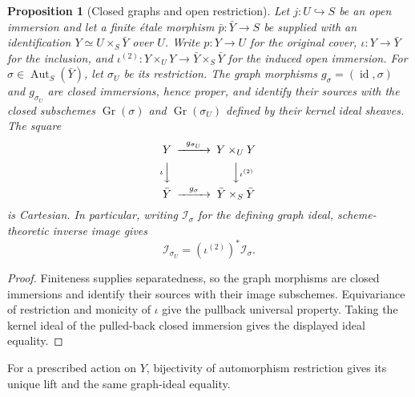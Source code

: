 \documentclass[11pt]{article}
\newtheorem{proposition}[theorem]{Proposition}
\theoremstyle{definition}
\theoremstyle{remark}
\begin{document}
\begin{proposition}[Closed graphs and open restriction]
\label{prop:graph-restriction}
Let \(j:U\hookrightarrow S\) be an open immersion and let a finite
\'{e}tale morphism \(\bar p:\bar Y\to S\) be supplied with an
identification \(Y\simeq U\times_S\bar Y\) over \(U\). Write
\(p:Y\to U\) for the original cover, \(\iota:Y\to\bar Y\) for the
inclusion, and \(\iota^{(2)}:Y\times_U Y\to\bar Y\times_S\bar Y\)
for the induced open immersion. For \(\sigma\in\operatorname{Aut}_S(\bar Y)\),
let \(\sigma_U\) be its restriction. The graph morphisms
\(g_\sigma=(\operatorname{id},\sigma)\) and \(g_{\sigma_U}\) are closed
immersions, hence proper, and identify their sources with the closed
subschemes \(\operatorname{Gr}(\sigma)\) and
\(\operatorname{Gr}(\sigma_U)\) defined by their kernel ideal sheaves.
The square
\[
\begin{CD}
Y @>{g_{\sigma_U}}>> Y\times_U Y\\
@V{\iota}VV @VV{\iota^{(2)}}V\\
\bar Y @>{g_\sigma}>> \bar Y\times_S\bar Y
\end{CD}
\]
is Cartesian. In particular, writing \(\mathcal I_\sigma\) for the
defining graph ideal, scheme-theoretic inverse image gives
\[
  \mathcal I_{\sigma_U}
    =(\iota^{(2)})^*\mathcal I_\sigma.
\]
\end{proposition}

\begin{proof}
Finiteness supplies separatedness, so the graph morphisms are closed
immersions and identify their sources with their image subschemes.
Equivariance of restriction and monicity of \(\iota\) give the pullback
universal property. Taking the kernel ideal of the pulled-back closed
immersion gives the displayed ideal equality.
\end{proof}

For a prescribed action on \(Y\), bijectivity of automorphism
restriction gives its unique lift and the same graph-ideal equality.
\end{document}
